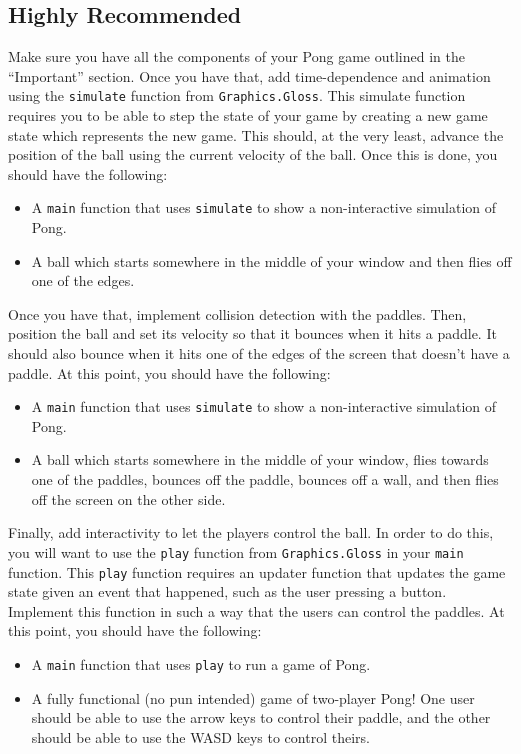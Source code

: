 \documentclass{article}
\begin{document}
\subsection*{Highly Recommended}
Make sure you have all the components of your Pong game outlined in the ``Important'' section. Once
you have that, add time-dependence and animation using the \texttt{simulate} function from
\texttt{Graphics.Gloss}. This simulate function requires you to be able to step the state of your
game by creating a new game state which represents the new game. This should, at the very least,
advance the position of the ball using the current velocity of the ball. Once this is done, you
should have the following:
\begin{itemize}
    \item A \texttt{main} function that uses \texttt{simulate} to show a non-interactive simulation
        of Pong.
    \item A ball which starts somewhere in the middle of your window and then flies off one of the
        edges.
\end{itemize}

Once you have that, implement collision detection with the paddles. Then, position the ball and set
its velocity so that it bounces when it hits a paddle. It should also bounce when it hits one of the
edges of the screen that doesn't have a paddle. At this point, you should have the following:
\begin{itemize}
    \item A \texttt{main} function that uses \texttt{simulate} to show a non-interactive simulation
        of Pong.
    \item A ball which starts somewhere in the middle of your window, flies towards one of the
        paddles, bounces off the paddle, bounces off a wall, and then flies off the screen on the
        other side.
\end{itemize}

Finally, add interactivity to let the players control the ball. In order to do this, you will want
to use the \texttt{play} function from \texttt{Graphics.Gloss} in your \texttt{main} function. This
\texttt{play} function requires an updater function that updates the game state given an event that
happened, such as the user pressing a button. Implement this function in such a way that the users
can control the paddles. At this point,  you should have the following:
\begin{itemize}
    \item A \texttt{main} function that uses \texttt{play} to run a game of Pong.
    \item A fully functional (no pun intended) game of two-player Pong! One user should be able to
        use the arrow keys to control their paddle, and the other should be able to use the WASD
        keys to control theirs.
\end{itemize}
\end{document}
